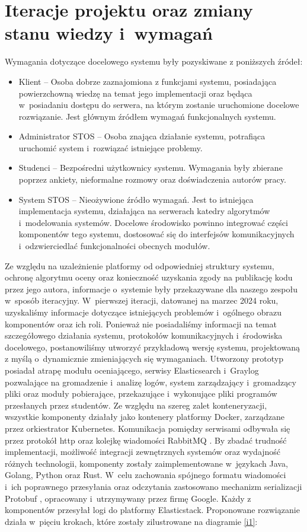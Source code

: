 \section{Iteracje projektu oraz zmiany stanu wiedzy i~wymagań}
Wymagania dotyczące docelowego systemu były pozyskiwane z poniższych źródeł:
\begin{itemize}
    \item Klient -- Osoba dobrze zaznajomiona z funkcjami systemu, posiadająca powierzchowną wiedzę na temat jego implementacji oraz będąca w~posiadaniu dostępu do serwera, na którym zostanie uruchomione docelowe rozwiązanie. Jest głównym źródłem wymagań funkcjonalnych systemu.
    \item Administrator STOS -- Osoba znająca działanie systemu, potrafiąca uruchomić system i~rozwiązać istniejące problemy.
    \item Studenci -- Bezpośredni użytkownicy systemu. Wymagania były zbierane poprzez ankiety, nieformalne rozmowy oraz doświadczenia autorów pracy.
    \item System STOS -- Nieożywione źródło wymagań. Jest to istniejąca implementacja systemu, działająca na serwerach katedry algorytmów i~modelowania systemów. Docelowe środowisko powinno integrować części komponentów tego systemu, dostosować się do interfejsów komunikacyjnych i~odzwierciedlać funkcjonalności obecnych modułów.
\end{itemize}
Ze względu na uzależnienie platformy od odpowiedniej struktury systemu, ochronę algorytmu oceny oraz konieczność uzyskania zgody na publikację kodu przez jego autora, informacje o~systemie były przekazywane dla naszego zespołu w~sposób iteracyjny.
\newline \indent W~pierwszej iteracji, datowanej na marzec 2024 roku, uzyskaliśmy informacje dotyczące istniejących problemów i~ogólnego obrazu komponentów oraz ich roli. Ponieważ nie posiadaliśmy informacji na temat szczegółowego działania systemu, protokołów komunikacyjnych i~środowiska docelowego, postanowiliśmy utworzyć przykładową wersję systemu, projektowaną z myślą o~dynamicznie zmieniających się wymaganiach. Utworzony prototyp posiadał atrapę modułu oceniającego, serwisy Elasticsearch i~Graylog pozwalające na gromadzenie i~analizę logów, system zarządzający i~gromadzący pliki oraz moduły pobierające, przekazujące i~wykonujące pliki programów przesłanych przez studentów. Ze względu na szereg zalet konteneryzacji, wszystkie komponenty działały jako kontenery platformy Docker, zarządzane przez orkiestrator Kubernetes. Komunikacja pomiędzy serwisami odbywała się przez protokół http oraz kolejkę wiadomości RabbitMQ \cite{rabbit}. By zbadać trudność implementacji, możliwość integracji zewnętrznych systemów oraz wydajność różnych technologii, komponenty zostały zaimplementowane w~językach Java, Golang, Python oraz Rust. W~celu zachowania spójnego formatu wiadomości i~ich poprawnego przesyłania oraz odczytania zastosowano mechanizm serializacji Protobuf \cite{protobuf}, opracowany i~utrzymywany przez firmę Google. Każdy z komponentów przesyłał logi do platformy Elasticstack. Proponowane rozwiązanie działa w~pięciu krokach, które zostały zilustrowane na diagramie \ref{i1}:
